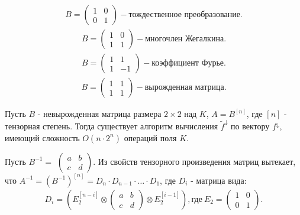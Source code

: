 \examplei
\begin{align*}
    B = 
    \begin{pmatrix}
        1 & 0\\
        0 & 1
    \end{pmatrix}
    - \text{тождественное преобразование}.
\end{align*}
\begin{align*}
    B = 
    \begin{pmatrix}
        1 & 0\\
        1 & 1
    \end{pmatrix}
    - \text{многочлен Жегалкина}.
\end{align*}
\begin{align*}
    B = 
    \begin{pmatrix}
        1 & 1\\
        1 & -1
    \end{pmatrix}
    - \text{коэффициент Фурье}.
\end{align*}
\begin{align*}
    B = 
    \begin{pmatrix}
        1 & 1\\
        1 & 1
    \end{pmatrix}
    - \text{вырожденная матрица}.
\end{align*}

\thr Пусть $B$ - невырожденная матрица размера $2 \times 2$  над $K$, $A = B^{[n]}$, где $[n]$ - тензорная степень.
Тогда существует алгоритм вычисления $\widetilde{f}^\downarrow$ по вектору $f^\downarrow$, имеющий сложность $O(n \cdot 2^n)$ операций поля $K$.

\proof Пусть $B^{-1} = $ $\begin{pmatrix}
        a & b\\
        c & d
    \end{pmatrix}$.
Из свойств тензорного произведения матриц вытекает, что $A^{-1} = (B^{-1})^{[n]}= D_n \cdot D_{n-1} \cdot \ldots \cdot D_1$, где $D_i$ - матрица вида:
\begin{align*}
    D_i = \left( E_2^{[n-i]} \otimes
    \begin{pmatrix}
        a & b\\
        c & d
    \end{pmatrix}
    \otimes E_2^{[i-1]} \right), \text{где}\  E_2 = 
    \begin{pmatrix}
        1 & 0 \\
        0 & 1
    \end{pmatrix}.
\end{align*}

